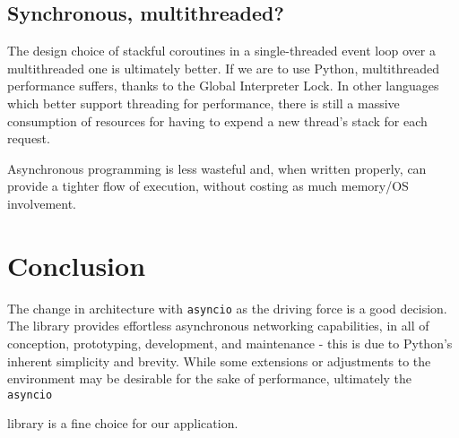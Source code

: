 \documentclass[letterpaper,twocolumn,10pt]{article}
\newcommand{\code}[1]{
    \texttt{#1}
}
\begin{document}
\subsection{Synchronous, multithreaded?}

The design choice of stackful coroutines in a single-threaded event loop over a multithreaded one is
ultimately better.  If we are to use Python, multithreaded performance suffers, thanks to the Global
Interpreter Lock.  In other languages which better support threading for performance, there is still
a massive consumption of resources for having to expend a new thread's stack for each request.

Asynchronous programming is less wasteful and, when written properly, can provide a tighter flow
of execution, without costing as much memory/OS involvement.


\section{Conclusion}

The change in architecture with \code{asyncio} as the driving force is a good decision.  The library
provides effortless asynchronous networking capabilities, in all of conception, prototyping, development,
and maintenance - this is due to Python's inherent simplicity and brevity.  While some extensions or
adjustments to the environment may be desirable for the sake of performance, ultimately the \code{asyncio}
library is a fine choice for our application.
\end{document}
